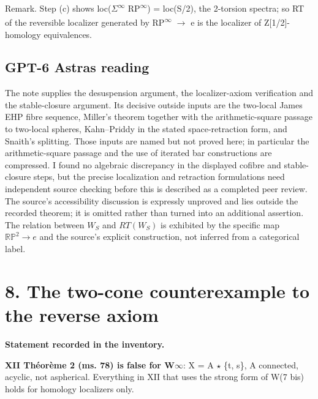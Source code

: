 Remark. Step (c) shows loc(\ensuremath{\Sigma}\textsuperscript{\ensuremath{\infty}} RP\textsuperscript{\ensuremath{\infty}}) = loc(S/2), the 2-torsion spectra; so RT of the reversible localizer generated by RP\textsuperscript{\ensuremath{\infty}} \ensuremath{\to} e is the localizer of Z[1/2]-homology equivalences.


\subsection*{GPT-6 Astra\textquotesingle s reading}

The note supplies the desuspension argument, the localizer-axiom verification and the stable-closure argument. Its decisive outside inputs are the two-local James EHP fibre sequence, Miller's theorem together with the arithmetic-square passage to two-local spheres, Kahn--Priddy in the stated space-retraction form, and Snaith's splitting. Those inputs are named but not proved here; in particular the arithmetic-square passage and the use of iterated bar constructions are compressed. I found no algebraic discrepancy in the displayed cofibre and stable-closure steps, but the precise localization and retraction formulations need independent source checking before this is described as a completed peer review. The source's accessibility discussion is expressly unproved and lies outside the recorded theorem; it is omitted rather than turned into an additional assertion. The relation between $W_S$ and $RT(W_S)$ is exhibited by the specific map $\mathbb{RP}^2\to e$ and the source's explicit construction, not inferred from a categorical label.

\par\bigskip

\section*{8. The two-cone counterexample to the reverse axiom}


\label{nr:entry8}

\noindent\textbf{Statement recorded in the inventory.}\par\smallskip

\textbf{XII Théorème 2 (ms. 78) is false for W\ensuremath{\infty}}: X = A \ensuremath{\star} \{t, s\}, A connected, acyclic, not aspherical. Everything in XII that uses the strong form of W(7 bis) holds for homology localizers only.


